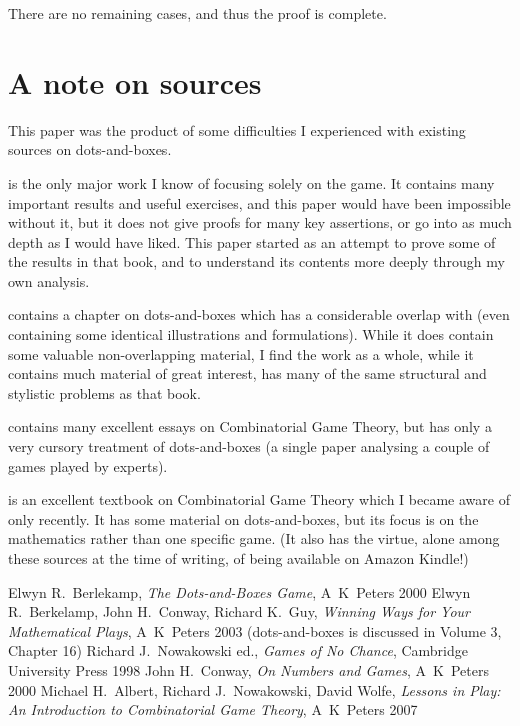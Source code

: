 \documentclass[a4paper,twocolumn]{article}
\begin{document}
There are no remaining cases, and thus the proof is complete.

\section{A note on sources}

This paper was the product of some difficulties I experienced with
existing sources on dots-and-boxes.

\cite{berl} is the only major work I know of focusing solely on the
game. It contains many important results and useful exercises, and
this paper would have been impossible without it, but it does not give
proofs for many key assertions, or go into as much depth as I would
have liked. This paper started as an attempt to prove some of the
results in that book, and to understand its contents more deeply
through my own analysis.

\cite{wways} contains a chapter on dots-and-boxes which has a
considerable overlap with \cite{berl} (even containing some identical
illustrations and formulations). While it does contain some valuable
non-overlapping material, I find the work as a whole, while it
contains much material of great interest, has many of the same
structural and stylistic problems as that book.

\cite{nochance} contains many excellent essays on Combinatorial Game
Theory, but has only a very cursory treatment of dots-and-boxes (a
single paper analysing a couple of games played by experts).

\cite{lip} is an excellent textbook on Combinatorial Game Theory which
I became aware of only recently. It has some material on
dots-and-boxes, but its focus is on the mathematics rather than one
specific game. (It also has the virtue, alone among these sources at
the time of writing, of being available on Amazon Kindle!)

\begin{thebibliography}{99}
   Elwyn R.\ Berlekamp, \emph{The Dots-and-Boxes Game},
    A~K~Peters 2000
   Elwyn R.\ Berkelamp, John H.\ Conway, Richard
    K.\ Guy, \emph{Winning Ways for Your Mathematical Plays},
    A~K~Peters 2003 (dots-and-boxes is discussed in Volume 3, Chapter
    16)
   Richard J.\ Nowakowski ed., \emph{Games of No
    Chance}, Cambridge University Press 1998
   John H.\ Conway, \emph{On Numbers and Games},
    A~K~Peters 2000
   Michael H.\ Albert, Richard J.\ Nowakowski, David
    Wolfe, \emph{Lessons in Play: An Introduction to Combinatorial
      Game Theory}, A~K~Peters 2007
\end{thebibliography}
\end{document}
